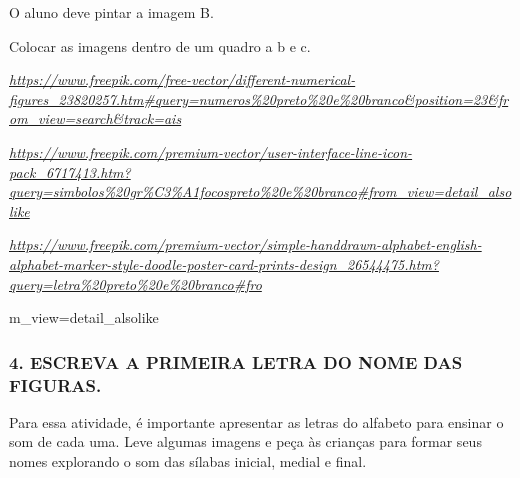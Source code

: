 O aluno deve pintar a imagem B.

Colocar as imagens dentro de um quadro a b e c.

\href{https://www.freepik.com/free-vector/different-numerical-figures_23820257.htm\#query=numeros\%20preto\%20e\%20branco\&position=23\&from_view=search\&track=ais}{\emph{https://www.freepik.com/free-vector/different-numerical-figures\_23820257.htm\#query=numeros\%20preto\%20e\%20branco\&position=23\&from\_view=search\&track=ais}}

\href{https://www.freepik.com/premium-vector/user-interface-line-icon-pack_6717413.htm?query=simbolos\%20gr\%C3\%A1focospreto\%20e\%20branco\#from_view=detail_alsolike}{\emph{https://www.freepik.com/premium-vector/user-interface-line-icon-pack\_6717413.htm?query=simbolos\%20gr\%C3\%A1focospreto\%20e\%20branco\#from\_view=detail\_alsolike}}

\href{https://www.freepik.com/premium-vector/simple-handdrawn-alphabet-english-alphabet-marker-style-doodle-poster-card-prints-design_26544475.htm?query=letra\%20preto\%20e\%20branco\#fro}{\emph{https://www.freepik.com/premium-vector/simple-handdrawn-alphabet-english-alphabet-marker-style-doodle-poster-card-prints-design\_26544475.htm?query=letra\%20preto\%20e\%20branco\#fro}}

m\_view=detail\_alsolike

\subsubsection{4. ESCREVA A PRIMEIRA LETRA DO NOME DAS
FIGURAS.}\label{escreva-a-primeira-letra-do-nome-das-figuras.}

Para essa atividade, é importante apresentar as letras do alfabeto para
ensinar o som de cada uma. Leve algumas imagens e peça às
crianças para formar seus nomes explorando o som das sílabas inicial, medial e
final.

